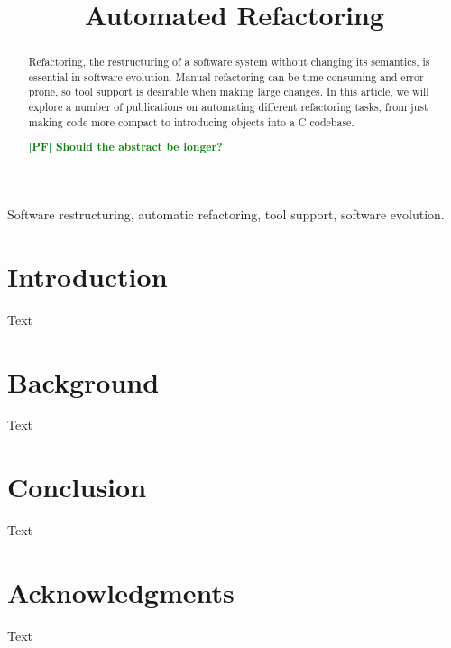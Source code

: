 \documentclass[conference,compsoc,a4paper]{IEEEtran}
\newcommand{\pf}[1]{\textcolor{green}{\textbf{[PF] #1}}}
\begin{document}
\title{Automated Refactoring}
\author{
  \and
}

\maketitle


\begin{abstract}
Refactoring, the restructuring of a software system without changing its semantics, is essential in software evolution. 
Manual refactoring can be time-consuming and error-prone, so tool support is desirable when making large changes. In 
this article, we will explore a number of publications on automating different refactoring tasks, from just making code 
more compact to introducing objects into a C codebase.

\pf{Should the abstract be longer?}
\end{abstract}

\begin{IEEEkeywords}
Software restructuring, automatic refactoring, tool support, software evolution.
\end{IEEEkeywords}

%
\IEEEpeerreviewmaketitle


\section{Introduction}

Text \cite{polymorphism}


\section{Background}

Text


\section{Conclusion}

Text


\section*{Acknowledgments}

Text






\end{document}

